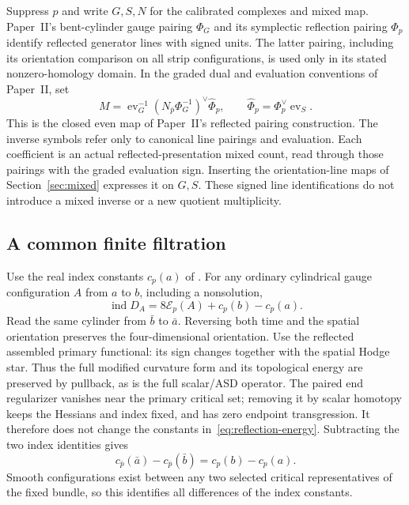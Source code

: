 \documentclass[11pt]{amsart}
\theoremstyle{definition}
\theoremstyle{remark}
\theoremstyle{plain}
\newcommand{\ind}{\operatorname{ind}}
\begin{document}
Suppress $p$ and write $G,S,N$ for the calibrated complexes and
mixed map. Paper~II's bent-cylinder gauge pairing $\Phi_G$ and
its symplectic reflection pairing $\Phi_p$ identify reflected
generator lines with signed units. The latter pairing, including
its orientation comparison on all strip configurations, is used
only in its stated nonzero-homology domain. In the graded dual
and evaluation conventions of Paper~II, set
\begin{equation}\label{eq:reflected-M}
 M=\operatorname{ev}_{G}^{-1}
       (N_{\bar p}\Phi_G^{-1})^\vee\widehat\Phi_p,
 \qquad \widehat\Phi_p=\Phi_p^\vee\operatorname{ev}_{S}.
\end{equation}
This is the closed even map of Paper~II's reflected pairing
construction. The inverse symbols refer only to canonical
line pairings and evaluation. Each coefficient is an actual
reflected-presentation mixed count, read through those pairings
with the graded evaluation sign. Inserting the orientation-line
maps of Section~\ref{sec:mixed} expresses it on $G,S$. These
signed line identifications do not introduce a mixed inverse
or a new quotient multiplicity.

\subsection{A common finite filtration}
Use the real index constants $c_p(a)$ of
\cite[Proposition~2.53]{DFL}. For any ordinary cylindrical gauge
configuration $A$ from $a$ to $b$, including a nonsolution,
\begin{equation}\label{eq:reflection-energy}
 \ind D_A=8\mathcal E_p(A)+c_p(b)-c_p(a).
\end{equation}
Read the same cylinder from $\bar b$ to $\bar a$. Reversing
both time and the spatial orientation preserves the four-dimensional
orientation. Use the reflected assembled primary functional:
its sign changes together with the spatial Hodge star. Thus the
full modified curvature form and its topological energy are
preserved by pullback, as is the full scalar/ASD operator.
The paired end regularizer vanishes near the primary critical
set; removing it by scalar homotopy keeps the Hessians and
index fixed, and has zero endpoint transgression. It therefore
does not change the constants in~\eqref{eq:reflection-energy}.
Subtracting the two index identities gives
\begin{equation}\label{eq:reversed-filtration}
 c_{\bar p}(\bar a)-c_{\bar p}(\bar b)
                     =c_p(b)-c_p(a).
\end{equation}
Smooth configurations exist between any two selected critical
representatives of the fixed bundle, so this identifies all
differences of the index constants.
\end{document}
